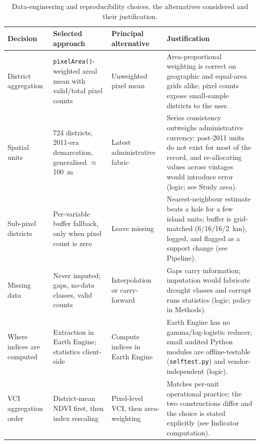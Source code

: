 \documentclass[10pt,a4paper]{article}
\begin{document}
\begin{table}[t]
\caption{Data-engineering and reproducibility choices, the alternatives considered and their justification.}
\label{tab:engchoices}
\footnotesize
\begin{tabularx}{\textwidth}{@{}p{}p{}p{}X@{}}
\toprule
Decision & Selected approach & Principal alternative & Justification \\
\midrule
District aggregation & \texttt{pixelArea()}-weighted areal mean with valid/total pixel counts & Unweighted pixel mean & Area-proportional weighting is correct on geographic and equal-area grids alike\citep{Gorelick2017}; pixel counts expose small-sample districts to the user. \\
Spatial units & 724 districts, 2011-era demarcation, generalised $\approx$100~m & Latest administrative fabric & Series consistency outweighs administrative currency: post-2011 units do not exist for most of the record, and re-allocating values across vintages would introduce error (logic; see Study area). \\
Sub-pixel districts & Per-variable buffer fallback, only when pixel count is zero & Leave missing & Nearest-neighbour estimate beats a hole for a few island units; buffer is grid-matched (6/16/16/2~km), logged, and flagged as a support change (see Pipeline). \\
Missing data & Never imputed; gaps, no-data classes, valid counts & Interpolation or carry-forward & Gaps carry information; imputation would fabricate drought classes and corrupt runs statistics (logic; policy in Methods). \\
Where indices are computed & Extraction in Earth Engine; statistics client-side & Compute indices in Earth Engine & Earth Engine has no gamma/log-logistic reducer; small audited Python modules are offline-testable (\texttt{selftest.py}) and vendor-independent (logic\citep{Gorelick2017}). \\
VCI aggregation order & District-mean NDVI first, then index rescaling & Pixel-level VCI, then area-weighting & Matches per-unit operational practice; the two constructions differ and the choice is stated explicitly (see Indicator computation). \\
\bottomrule
\end{tabularx}
\end{table}
\end{document}
